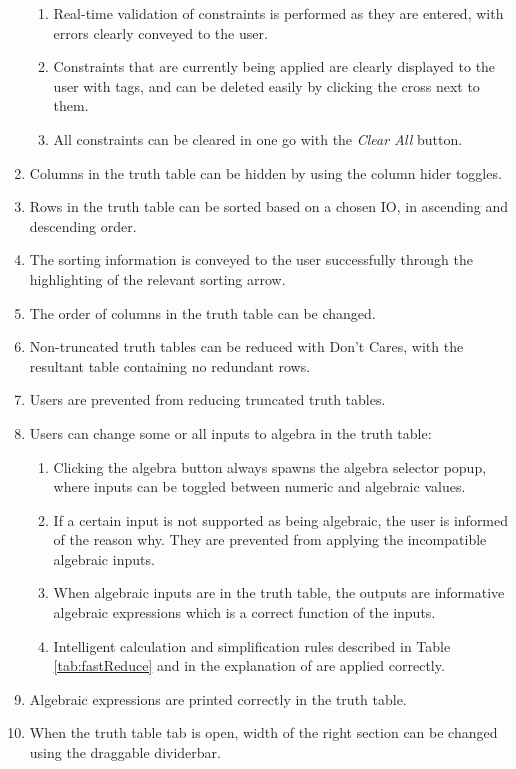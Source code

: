 \begin{enumerate}
\begin{enumerate}
        \item Real-time validation of constraints is performed as they are entered, with errors clearly conveyed to the user.
        \item Constraints that are currently being applied are clearly displayed to the user with tags, and can be deleted easily by clicking the cross next to them.
        \item All constraints can be cleared in one go with the \textit{Clear All} button.
    \end{enumerate}
    \item Columns in the truth table can be hidden by using the column hider toggles.
    \item Rows in the truth table can be sorted based on a chosen IO, in ascending and descending order.
    \item The sorting information is conveyed to the user successfully through the highlighting of the relevant sorting arrow.
    \item The order of columns in the truth table can be changed.
    \item Non-truncated truth tables can be reduced with Don't Cares, with the resultant table containing no redundant rows.
    \item Users are prevented from reducing truncated truth tables.
    \item Users can change some or all inputs to algebra in the truth table:
    \begin{enumerate}
        \item Clicking the algebra button always spawns the algebra selector popup, where inputs can be toggled between numeric and algebraic values.
        \item If a certain input is not supported as being algebraic, the user is informed of the reason why. They are prevented from applying the incompatible algebraic inputs.
        \item When algebraic inputs are in the truth table, the outputs are informative algebraic expressions which is a correct function of the inputs.
        \item Intelligent calculation and simplification rules described in Table \ref{tab:fastReduce} and in the explanation of  are applied correctly.
    \end{enumerate}
    \item Algebraic expressions are printed correctly in the truth table.
    \item When the truth table tab is open, width of the right section can be changed using the draggable dividerbar.

\end{enumerate}
